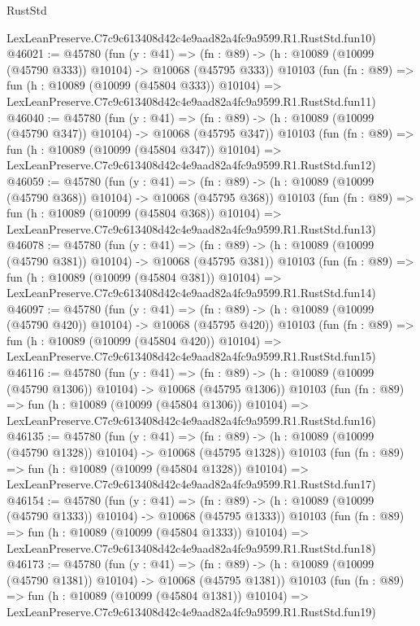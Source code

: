 \begin{lexlean}{RustStd}
\begin{coremodule}
    LexLeanPreserve.C7c9c613408d42c4e9aad82a4fc9a9599.R1.RustStd.fun10)
@46021 := @45780
    (fun (y : @41) =>
    (fn : @89) -> (h : @10089 (@10099 (@45790 @333)) @10104) -> @10068 (@45795 @333))
    @10103
    (fun (fn : @89) =>
    fun (h : @10089 (@10099 (@45804 @333)) @10104) =>
    LexLeanPreserve.C7c9c613408d42c4e9aad82a4fc9a9599.R1.RustStd.fun11)
@46040 := @45780
    (fun (y : @41) =>
    (fn : @89) -> (h : @10089 (@10099 (@45790 @347)) @10104) -> @10068 (@45795 @347))
    @10103
    (fun (fn : @89) =>
    fun (h : @10089 (@10099 (@45804 @347)) @10104) =>
    LexLeanPreserve.C7c9c613408d42c4e9aad82a4fc9a9599.R1.RustStd.fun12)
@46059 := @45780
    (fun (y : @41) =>
    (fn : @89) -> (h : @10089 (@10099 (@45790 @368)) @10104) -> @10068 (@45795 @368))
    @10103
    (fun (fn : @89) =>
    fun (h : @10089 (@10099 (@45804 @368)) @10104) =>
    LexLeanPreserve.C7c9c613408d42c4e9aad82a4fc9a9599.R1.RustStd.fun13)
@46078 := @45780
    (fun (y : @41) =>
    (fn : @89) -> (h : @10089 (@10099 (@45790 @381)) @10104) -> @10068 (@45795 @381))
    @10103
    (fun (fn : @89) =>
    fun (h : @10089 (@10099 (@45804 @381)) @10104) =>
    LexLeanPreserve.C7c9c613408d42c4e9aad82a4fc9a9599.R1.RustStd.fun14)
@46097 := @45780
    (fun (y : @41) =>
    (fn : @89) -> (h : @10089 (@10099 (@45790 @420)) @10104) -> @10068 (@45795 @420))
    @10103
    (fun (fn : @89) =>
    fun (h : @10089 (@10099 (@45804 @420)) @10104) =>
    LexLeanPreserve.C7c9c613408d42c4e9aad82a4fc9a9599.R1.RustStd.fun15)
@46116 := @45780
    (fun (y : @41) =>
    (fn : @89) -> (h : @10089 (@10099 (@45790 @1306)) @10104) -> @10068 (@45795 @1306))
    @10103
    (fun (fn : @89) =>
    fun (h : @10089 (@10099 (@45804 @1306)) @10104) =>
    LexLeanPreserve.C7c9c613408d42c4e9aad82a4fc9a9599.R1.RustStd.fun16)
@46135 := @45780
    (fun (y : @41) =>
    (fn : @89) -> (h : @10089 (@10099 (@45790 @1328)) @10104) -> @10068 (@45795 @1328))
    @10103
    (fun (fn : @89) =>
    fun (h : @10089 (@10099 (@45804 @1328)) @10104) =>
    LexLeanPreserve.C7c9c613408d42c4e9aad82a4fc9a9599.R1.RustStd.fun17)
@46154 := @45780
    (fun (y : @41) =>
    (fn : @89) -> (h : @10089 (@10099 (@45790 @1333)) @10104) -> @10068 (@45795 @1333))
    @10103
    (fun (fn : @89) =>
    fun (h : @10089 (@10099 (@45804 @1333)) @10104) =>
    LexLeanPreserve.C7c9c613408d42c4e9aad82a4fc9a9599.R1.RustStd.fun18)
@46173 := @45780
    (fun (y : @41) =>
    (fn : @89) -> (h : @10089 (@10099 (@45790 @1381)) @10104) -> @10068 (@45795 @1381))
    @10103
    (fun (fn : @89) =>
    fun (h : @10089 (@10099 (@45804 @1381)) @10104) =>
    LexLeanPreserve.C7c9c613408d42c4e9aad82a4fc9a9599.R1.RustStd.fun19)

\end{coremodule}
\end{lexlean}
